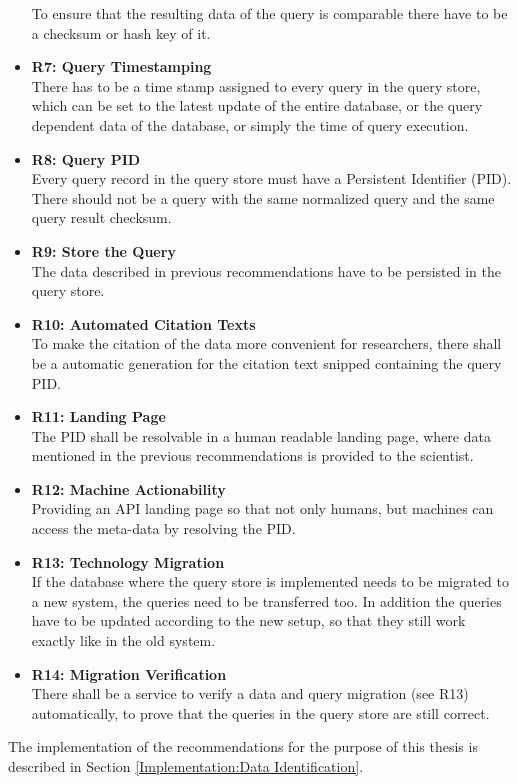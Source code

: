 \documentclass[draft,final]{vutinfth} %
\begin{document}
\begin{itemize}
	To ensure that the resulting data of the query is comparable there have to be a checksum or hash key of it. 
	\item \textbf{R7: Query Timestamping} \\
	There has to be a time stamp assigned to every query in the query store, which can be set to the latest update of the entire database, or the query dependent data of the database, or simply the time of query execution.
	\item \textbf{R8: Query PID}\\
	Every query record in the query store must have a Persistent Identifier (PID). There should not be a query with the same normalized query and the same query result checksum. 
	\item \textbf{R9: Store the Query} \\
	The data described in previous recommendations have to be persisted in the query store.
	\item \textbf{R10: Automated Citation Texts} \\
	To make the citation of the data more convenient for researchers, there shall be a automatic generation for the citation text snipped containing the query PID.
	\item \textbf{R11: Landing Page} \\
	The PID shall be resolvable in a human readable landing page, where data mentioned in the previous recommendations is provided to the scientist.
	\item \textbf{R12: Machine Actionability} \\
	Providing an API landing page so that not only humans, but machines can access the meta-data by resolving the PID.
	\item \textbf{R13: Technology Migration} \\
	If the database where the query store is implemented needs to be migrated to a new system, the queries need to be transferred too. In addition the queries have to be updated according to the new setup, so that they still work exactly like in the old system.
	\item \textbf{R14: Migration Verification} \\
	There shall be a service to verify a data and query migration (see R13) automatically, to prove that the queries in the query store are still correct. 
\end{itemize}
The implementation of the recommendations for the purpose of this thesis is described in Section \ref{Implementation:Data Identification}. 
\end{document}
